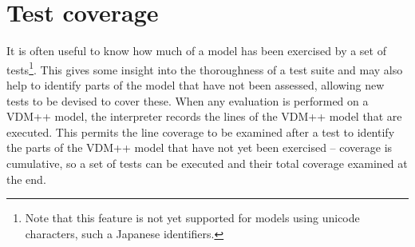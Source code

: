 %
\section{Test coverage}\label{sec:testcov}
It is often useful to know how much of a model has been exercised by a set of tests\footnote{Note that this feature is not yet supported for   models using unicode characters, such a Japanese identifiers.}. This gives some insight into the thoroughness of a test suite and may also help to identify parts of the model that have not been assessed, allowing new tests to be devised to cover these. When any evaluation is performed on a VDM++ model, the interpreter records the lines of the VDM++ model that are executed. This permits the line coverage to be examined after a test to identify the parts of the VDM++ model that have not yet been exercised -- coverage is cumulative, so a set of tests can be executed and their total coverage examined at the end.

